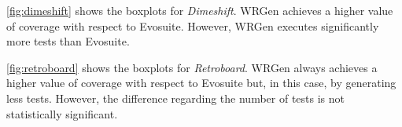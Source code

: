 \begin{figure}[H]
	\centering
	
	
\end{figure}




\autoref{fig:dimeshift} shows the boxplots for \textit{Dimeshift}. WRGen achieves a higher value of coverage with respect to Evosuite. However, WRGen executes significantly more tests than Evosuite.

\autoref{fig:retroboard} shows the boxplots for \textit{Retroboard}. WRGen always achieves a higher value of coverage with respect to Evosuite but, in this case, by generating less tests. However, the difference regarding the number of tests is not statistically significant.



\begin{figure}[H]
	\centering
	
	
\end{figure}
\begin{figure}[H]
	\centering
	
\end{figure}

